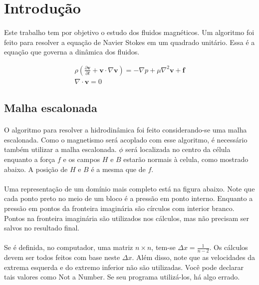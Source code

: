 \documentclass[introducao.tex]{subfiles}
\begin{document}
\section{Introdução}
\paragraph{} Este trabalho tem por objetivo o estudo dos fluidos magnéticos. Um algoritmo foi feito para resolver a equação de Navier Stokes em um quadrado unitário. Essa é a equação que governa a dinâmica dos fluidos.

\begin{eqnarray}
\rho\left( \frac{\partial {\textbf{v}}}{\partial t}+\textbf{v}\cdot\nabla \textbf{v} \right)=-\nabla p+\mu\nabla^2 \textbf{v} + \textbf{f}\label{navierstokes}\\
\nabla\cdot\textbf{v}=0
\end{eqnarray}


\subsection{Malha escalonada}
\paragraph{} O algoritmo para resolver a hidrodinâmica foi feito considerando-se uma malha escalonada. Como o magnetismo será acoplado com esse algoritmo, é necessário também utilizar a malha escalonada. $\phi$ será localizada no centro da célula enquanto a força $f$ e os campos $H$ e $B$ estarão normais à celula, como mostrado abaixo. A posição de $H$ e $B$ é a mesma que de $f$.

\begin{center}
\end{center}

\paragraph{} Uma representação de um domínio mais completo está na figura abaixo. Note que cada ponto preto no meio de um bloco é a pressão em ponto interno. Enquanto a pressão em pontos da fronteira imaginária são círculos com interior branco. Pontos na fronteira imaginária são utilizados nos cálculos, mas não precisam ser salvos no resultado final.

\paragraph{} Se é definida, no computador, uma matriz $n\times n$, tem-se $\Delta x = \frac{1}{n-2}$. Os cálculos devem ser todos feitos com base neste $\Delta x$. Além disso, note que as velocidades da extrema esquerda e do extremo inferior não são utilizadas. Você pode declarar tais valores como Not a Number. Se seu programa utilizá-los, há algo errado.

\domainOne
\end{document}
